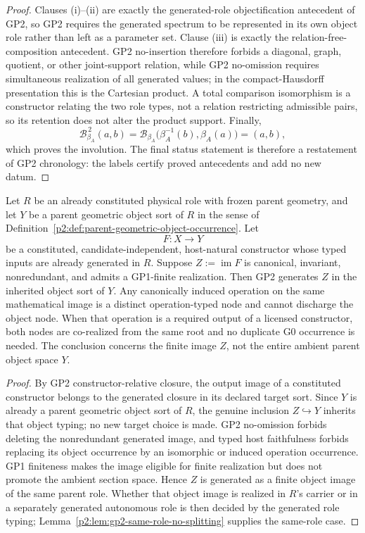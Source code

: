 \documentclass[12pt,a4paper]{article}
\begin{document}
\begin{proof}
Clauses (i)--(ii) are exactly the generated-role objectification antecedent of
GP2, so GP2 requires the generated spectrum to be represented in its own
object role rather than left as a parameter set.  Clause (iii) is exactly the
relation-free-composition antecedent.  GP2 no-insertion therefore forbids a
diagonal, graph, quotient, or other joint-support relation, while GP2
no-omission requires simultaneous realization of all generated values; in the
compact-Hausdorff presentation this is the Cartesian product.  A total
comparison isomorphism is a constructor relating the two role types, not a
relation restricting admissible pairs, so its retention does not alter the
product support.  Finally,
\[
 \mathcal B_{\beta_A}^{\,2}(a,b)
 =\mathcal B_{\beta_A}\bigl(\beta_A^{-1}(b),\beta_A(a)\bigr)
 =(a,b),
\]
which proves the involution.  The final status statement is therefore a
restatement of GP2 chronology: the labels certify proved antecedents and add
no new datum.
\end{proof}

\begin{lemma}
\label{p2:lem:gp2-finite-generated-image-inheritance}
Let \(R\) be an already constituted physical role with frozen parent geometry,
and let \(Y\) be a parent geometric object sort of \(R\) in the sense of
Definition~\ref{p2:def:parent-geometric-object-occurrence}.  Let
\[
 F:X\longrightarrow Y
\]
be a constituted, candidate-independent, host-natural constructor whose typed
inputs are already generated in \(R\).  Suppose
\(Z:=\operatorname{im}F\) is canonical, invariant, nonredundant, and admits a
GP1-finite realization.  Then GP2 generates \(Z\) in the inherited object sort
of \(Y\).  Any canonically induced operation on the same mathematical image
is a distinct operation-typed node and cannot discharge the object node.
When that operation is a required output of a licensed constructor, both
nodes are co-realized from the same root and no duplicate G0 occurrence is
needed.  The conclusion concerns the finite image \(Z\), not the entire
ambient parent object space \(Y\).
\end{lemma}

\begin{proof}
By GP2 constructor-relative closure, the output image of a constituted
constructor belongs to the generated closure in its declared target sort.
Since \(Y\) is already a parent geometric object sort of \(R\), the genuine
inclusion \(Z\hookrightarrow Y\) inherits that object typing; no new target
choice is made.  GP2 no-omission forbids deleting the nonredundant generated
image, and typed host faithfulness forbids replacing its object occurrence by
an isomorphic or induced operation occurrence.  GP1 finiteness makes the image
eligible for finite realization but does not promote the ambient section
space.  Hence \(Z\) is generated as a finite object image of the same parent
role.  Whether that object image is realized in \(R\)'s carrier or in a
separately generated autonomous role is then decided by the generated role
typing; Lemma~\ref{p2:lem:gp2-same-role-no-splitting} supplies the same-role
case.
\end{proof}
\end{document}
